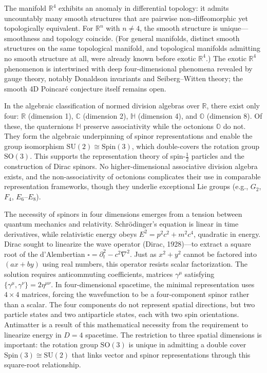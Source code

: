 The manifold $\mathbb{R}^4$ exhibits an anomaly in differential topology: it admits uncountably many smooth structures that are pairwise non-diffeomorphic yet topologically equivalent. For $\mathbb{R}^n$ with $n \ne 4$, the smooth structure is unique—smoothness and topology coincide. (For general manifolds, distinct smooth structures on the same topological manifold, and topological manifolds admitting no smooth structure at all, were already known before exotic $\mathbb{R}^4$.) The exotic $\mathbb{R}^4$ phenomenon is intertwined with deep four-dimensional phenomena revealed by gauge theory, notably Donaldson invariants and Seiberg–Witten theory; the smooth 4D Poincaré conjecture itself remains open.

In the algebraic classification of normed division algebras over $\mathbb{R}$, there exist only four: $\mathbb{R}$ (dimension 1), $\mathbb{C}$ (dimension 2), $\mathbb{H}$ (dimension 4), and $\mathbb{O}$ (dimension 8). Of these, the quaternions $\mathbb{H}$ preserve associativity while the octonions $\mathbb{O}$ do not. They form the algebraic underpinning of spinor representations and enable the group isomorphism $\mathrm{SU}(2) \cong \mathrm{Spin}(3)$, which double-covers the rotation group $\mathrm{SO}(3)$. This supports the representation theory of spin-$\tfrac{1}{2}$ particles and the construction of Dirac spinors. No higher-dimensional associative division algebra exists, and the non-associativity of octonions complicates their use in comparable representation frameworks, though they underlie exceptional Lie groups (e.g., $G_2$, $F_4$, $E_6$–$E_8$).

The necessity of spinors in four dimensions emerges from a tension between quantum mechanics and relativity. Schrödinger's equation is linear in time derivatives, while relativistic energy obeys $E^2 = p^2c^2 + m^2c^4$, quadratic in energy. Dirac sought to linearize the wave operator (Dirac, 1928)—to extract a \QSOpen{}square root\QSClose{} of the d'Alembertian $\square = \partial_t^2 - c^2\nabla^2$. Just as $x^2 + y^2$ cannot be factored into $(ax+by)$ using real numbers, this operator resists scalar factorization. The solution requires anticommuting coefficients, matrices $\gamma^\mu$ satisfying $\{\gamma^\mu, \gamma^\nu\} = 2\eta^{\mu\nu}$. In four-dimensional spacetime, the minimal representation uses $4\times 4$ matrices, forcing the wavefunction to be a four-component spinor rather than a scalar. The four components do not represent spatial directions, but two particle states and two antiparticle states, each with two spin orientations. Antimatter is a result of this mathematical necessity from the requirement to linearize energy in $D=4$ spacetime. The restriction to three spatial dimensions is important: the rotation group $\mathrm{SO}(3)$ is unique in admitting a double cover $\mathrm{Spin}(3) \cong \mathrm{SU}(2)$ that links vector and spinor representations through this square-root relationship.

